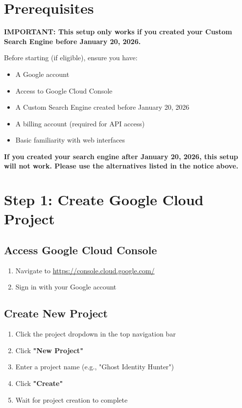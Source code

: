 \documentclass[11pt,a4paper]{article}
\begin{document}
\section{Prerequisites}

\textbf{IMPORTANT: This setup only works if you created your Custom Search Engine before January 20, 2026.}

Before starting (if eligible), ensure you have:

\begin{itemize}
    \item A Google account
    \item Access to Google Cloud Console
    \item A Custom Search Engine created before January 20, 2026
    \item A billing account (required for API access)
    \item Basic familiarity with web interfaces
\end{itemize}

\textbf{If you created your search engine after January 20, 2026, this setup will not work. Please use the alternatives listed in the notice above.}

\section{Step 1: Create Google Cloud Project}

\subsection{Access Google Cloud Console}

\begin{enumerate}
    \item Navigate to \url{https://console.cloud.google.com/}
    \item Sign in with your Google account
\end{enumerate}

\subsection{Create New Project}

\begin{enumerate}
    \item Click the project dropdown in the top navigation bar
    \item Click \textbf{"New Project"}
    \item Enter a project name (e.g., "Ghost Identity Hunter")
    \item Click \textbf{"Create"}
    \item Wait for project creation to complete
\end{enumerate}
\end{document}

